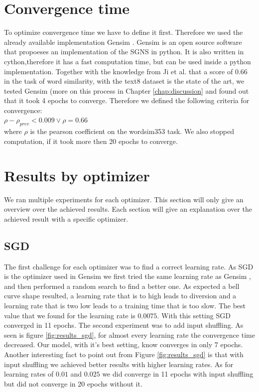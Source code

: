\section{Convergence time} 
To optimize convergence time we have to define it first. Therefore we used the already available implementation Gensim \cite{gensim}. Gensim is an open source software that propoeses an implementation of the SGNS in python. It is also written in cython,therefore it has a fast computation time, but can be used inside a python implementation. Together with the knowledge from Ji et al.\cite{intel} that a score of $0.66$ in the task of word similarity, with the text8 dataset is the state of the art, we tested Gensim (more on this process in Chapter \ref{chap:discussion} and found out  that it took 4 epochs to converge. Therefore we defined the following criteria for convergence: \\
$\rho - \rho_{prev} < 0.009 \vee \rho = 0.66$ \\
where $\rho$ is the pearson coefficient on the wordsim353 task. 
We also stopped computation, if it took more then 20 epochs to converge. 

\section{Results by optimizer}
We ran multiple experiments for each optimizer. This section will only give an overview over the achieved results. Each section will give an explanation over the achieved result with a specific optimizer.

\subsection{SGD}
The first challenge for each optimizer was to find a correct learning rate. As SGD is the optimizer used in Gensim \cite{gensim} we first tried the same learning rate as Gensim \cite{gensim}, and then performed a random search to find a better one. As expected a bell curve shape resulted, a learning rate that is to high leads to diversion and  a learning rate that is two low leads to a training time that is too slow. The best value that we found for the learning rate is $0.0075$. With this setting SGD converged in 11 epochs. The second experiment was to add input shuffling. 
As seen is figure \ref{fig:results_sgd}, for almost every learning rate the convergence time decreased. Our model, with it's best setting, know converges in only 7 epochs. Another interesting  fact to point out from Figure \ref{fig:results_sgd} is that with input shuffling we achieved better results with higher learning rates. As for learning rates of $0.01$ and $0.025$ we did converge in 11 epochs with input shuffling but did not converge in 20 epochs without it.

